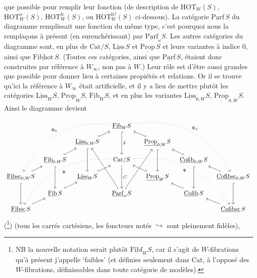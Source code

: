 \documentclass[11pt]{article}
\newcommand{\ul}[1]{\underline{\mathrm{#1}}}
\begin{document}
que possible pour remplir leur fonction (de description de $\mathrm{HOT}_W(S)$, $\mathrm{HOT}^{o}_W(S)$, $\mathrm{HOT}^{\mathrm{lc}}_W(S)$, ou $\mathrm{HOT}^{\mathrm{lc}!}_W(S)$ ci-dessous). La catégorie $\ul{Parf}\,S$ du diagramme remplissait une fonction du même type, c'est pourquoi nous la remplaçons à présent (en surenchérissant) par $\ul{Parf}_\omega S$. Les autres catégories du diagramme sont, en plus de $\mathrm{Cat}/S$, $\ul{Liss}\,S$ et $\ul{Prop}\,S$ et leurs variantes à indice 0, ainsi que $\ul{Fibhot}\,S$. (Toutes ces catégories, ainsi que $\ul{Parf}\,S$, étaient donc construites par référence à $W_\infty$, non pas à $W$.) Leur rôle est d'être aussi grandes que possible pour donner lieu à certaines propiétés et relations. Or il se trouve qu'ici la référence à $W_\infty$ était artificielle, et il y a lieu de mettre plutôt les catégories $\ul{Liss}_W S$, $\ul{Prop}_W S$, $\ul{Fib}_W S$, et en plus les variantes $\ul{Liss}_{0,W} S$, $\ul{Prop}_{0,W} S$. Ainsi le diagramme devient %
\[
\begin{tikzcd}[column sep=tiny, row sep=small]
 & & & & \ul{Fib}_W S \arrow[dd, hook, "\delta"] \arrow[dddllll, dotted, bend right=35, "\Phi_0"'] \arrow[dddrrrr, dotted, bend left=35, "\Psi_0"] & & & & \\
 & & \ul{Liss}_{0,W} S \arrow[urr, hook] \arrow[dd, hook] & & & & \ul{Prop}_{0,W} S \arrow[ull, hook'] \arrow[dd, hook] & & \\
 & \ul{Fib}_{0,W} S \arrow[ur, hook] \arrow[dd, hook] & & & \mathrm{Cat}/S \arrow[dd, "C"] \arrow[dddllll, dotted, bend right=30, "\Phi"] \arrow[dddrrrr, dotted, bend left=30, "\Psi"'] & & & \ul{Cofib}_{0,W} S \arrow[ul, hook'] \arrow[dd, hook] & \\
\ul{Fibsc}_{0,W} S \arrow[ur] \arrow[dd, hook] & & \ul{Liss}_W S \arrow[urr, hook] & & & & \ul{Prop}_W S \arrow[ull, hook'] & & \ul{Cofibsc}_{0,W} S \arrow[ul] \arrow[dd, hook] \\
 & \ul{Fib}\,S \arrow[ur, hook] & & & \ul{Parf}_\omega S \arrow[uuull, hook] \arrow[uuurr, hook'] & & & \ul{Cofib}\,S \arrow[ul, hook'] & \\
\ul{Fibsc}\,S \arrow[ur] & & & & & & & & \ul{Cofibsc}\,S \arrow[ul]
\end{tikzcd}
\]
(\footnote{NB la nouvelle notation serait plutôt $\ul{Fibf}_W S$, car il s'agit de $W$-fibrations qu'à présent j'appelle `faibles' (et définies seulement dans Cat, à l'opposé des $W$-fibrations, définissables dans toute catégorie de modèles).}) (tous les carrés cartésiens, les foncteurs notés $\hookrightarrow$ sont pleinement fidèles),
\end{document}
